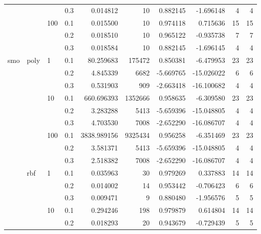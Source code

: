 \begin{table}[H]
\begin{tabular}{llllrrrrrr}
       &     &     & 0.3 &     0.014812 &       10 &  0.882145 &  -1.696148 &           4 &         4 \\
       &     & 100 & 0.1 &     0.015500 &       10 &  0.974118 &   0.715636 &          15 &        15 \\
       &     &     & 0.2 &     0.018510 &       10 &  0.965122 &  -0.935738 &           7 &         7 \\
       &     &     & 0.3 &     0.018584 &       10 &  0.882145 &  -1.696145 &           4 &         4 \\
smo & poly & 1   & 0.1 &    80.259683 &   175472 &  0.850381 &  -6.479953 &          23 &        23 \\
       &     &     & 0.2 &     4.845339 &     6682 & -5.669765 & -15.026022 &           6 &         6 \\
       &     &     & 0.3 &     0.531903 &      909 & -2.663418 & -16.100682 &           4 &         4 \\
       &     & 10  & 0.1 &   660.696393 &  1352666 &  0.958635 &  -6.309580 &          23 &        23 \\
       &     &     & 0.2 &     3.283288 &     5413 & -5.659396 & -15.048805 &           4 &         4 \\
       &     &     & 0.3 &     4.703530 &     7008 & -2.652290 & -16.086707 &           4 &         4 \\
       &     & 100 & 0.1 &  3838.989156 &  9325434 &  0.956258 &  -6.351469 &          23 &        23 \\
       &     &     & 0.2 &     3.581371 &     5413 & -5.659396 & -15.048805 &           4 &         4 \\
       &     &     & 0.3 &     2.518382 &     7008 & -2.652290 & -16.086707 &           4 &         4 \\
       & rbf & 1   & 0.1 &     0.035963 &       30 &  0.979269 &   0.337883 &          14 &        14 \\
       &     &     & 0.2 &     0.014002 &       14 &  0.953442 &  -0.706423 &           6 &         6 \\
       &     &     & 0.3 &     0.009471 &        9 &  0.880480 &  -1.956576 &           5 &         5 \\
       &     & 10  & 0.1 &     0.294246 &      198 &  0.979879 &   0.614804 &          14 &        14 \\
       &     &     & 0.2 &     0.018293 &       20 &  0.943679 &  -0.729439 &           5 &         5 \\

\end{tabular}
\end{table}
